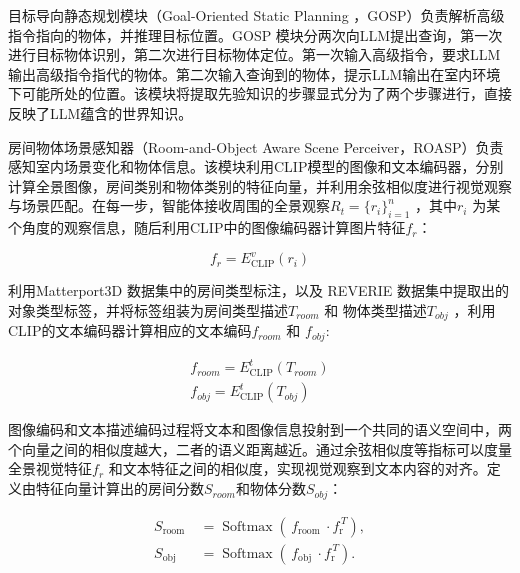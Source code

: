 \documentclass[bachelor]{thesis-uestc}
\begin{document}

目标导向静态规划模块（Goal-Oriented Static Planning ，GOSP）负责解析高级指令指向的物体，并推理目标位置。GOSP 模块分两次向LLM提出查询，第一次进行目标物体识别，第二次进行目标物体定位。第一次输入高级指令，要求LLM输出高级指令指代的物体。第二次输入查询到的物体，提示LLM输出在室内环境下可能所处的位置。该模块将提取先验知识的步骤显式分为了两个步骤进行，直接反映了LLM蕴含的世界知识。

房间物体场景感知器（Room-and-Object Aware Scene Perceiver，ROASP）负责感知室内场景变化和物体信息。该模块利用CLIP模型\cite{radford2021learning}的图像和文本编码器，分别计算全景图像，房间类别和物体类别的特征向量，并利用余弦相似度进行视觉观察与场景匹配。在每一步，智能体接收周围的全景观察$R_t = \{r_i\}_{i=1}^n$ ，其中$r_i$ 为某个角度的观察信息，随后利用CLIP中的图像编码器计算图片特征$f_r$：

\begin{equation}
    f_r = E^{v}_{\text{CLIP}}(r_i)
\label{fr}
\end{equation}

利用Matterport3D 数据集中的房间类型标注，以及 REVERIE 数据集中提取出的对象类型标签，并将标签组装为房间类型描述$T_{room}$ 和 物体类型描述$T_{obj}$ ，利用CLIP的文本编码器计算相应的文本编码$f_{room}$ 和 $f_{obj}$:

\begin{equation}
    \begin{aligned}
        f_{room} = E^{t}_{\text{CLIP}}(T_{room})\\
        f_{obj} = E^{t}_{\text{CLIP}}(T_{obj})
    \end{aligned}
\label{fobj}
\end{equation}

图像编码和文本描述编码过程将文本和图像信息投射到一个共同的语义空间中，两个向量之间的相似度越大，二者的语义距离越近。通过余弦相似度等指标可以度量全景视觉特征$f_r$ 和文本特征之间的相似度，实现视觉观察到文本内容的对齐。定义由特征向量计算出的房间分数$S_{room}$和物体分数$S_{obj}$：

\begin{equation}
    \begin{aligned}
        S_{\text {room }} & =\operatorname{Softmax}\left(\,f_{\text {room }} \cdot f_{\mathrm{r}}^{\,T}\right), \\
        S_{\text {obj }} & =\operatorname{Softmax}\left(\,f_{\text {obj }} \cdot f_{\mathrm{r}}^{\,T}\right) .
        \end{aligned}
\label{s}
\end{equation}
\end{document}
